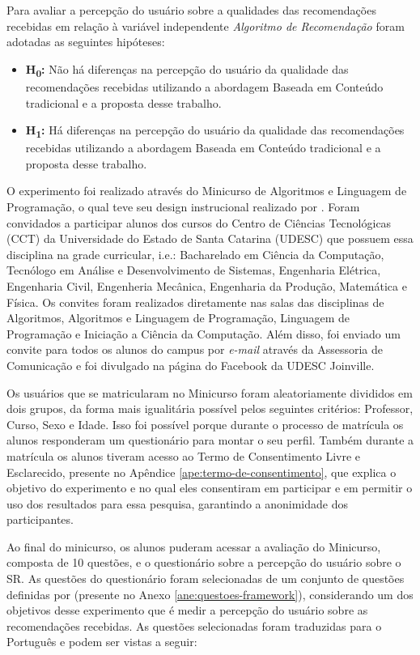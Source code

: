 Para avaliar a percepção do usuário sobre a qualidades das recomendações recebidas em relação
à variável independente \textit{Algoritmo de Recomendação} foram adotadas as seguintes hipóteses:

\begin{itemize}
\item \textbf{H\textsubscript{0}:} Não há diferenças na percepção do usuário da qualidade das recomendações recebidas utilizando a abordagem
Baseada em Conteúdo tradicional e a proposta desse trabalho.
\item \textbf{H\textsubscript{1}:} Há diferenças na percepção do usuário da qualidade das recomendações recebidas utilizando a abordagem
Baseada em Conteúdo tradicional e a proposta desse trabalho.
\end{itemize}

O experimento foi realizado através do Minicurso de Algoritmos e Linguagem de Programação, o qual teve seu design
instrucional realizado por . Foram convidados a participar alunos dos cursos do
Centro de Ciências Tecnológicas (CCT) da Universidade do Estado de Santa Catarina (UDESC) que possuem essa disciplina na
grade curricular, i.e.: Bacharelado em Ciência da Computação, Tecnólogo em Análise e Desenvolvimento de Sistemas, Engenharia
Elétrica, Engenharia Civil, Engenheria Mecânica, Engenharia da Produção, Matemática e Física. Os convites foram
realizados diretamente nas salas das disciplinas de Algoritmos, Algoritmos e Linguagem de Programação, Linguagem de
Programação e Iniciação a Ciência da Computação. Além disso, foi enviado um convite para todos os alunos do campus por
\textit{e-mail} através da Assessoria de Comunicação e foi divulgado na página do Facebook da UDESC Joinville.

Os usuários que se matricularam no Minicurso foram aleatoriamente divididos em dois grupos, da forma mais igualitária possível
pelos seguintes critérios: Professor, Curso, Sexo e Idade. Isso foi possível
porque durante o processo de matrícula os alunos responderam um questionário para montar o seu perfil. Também durante a
matrícula os alunos tiveram acesso ao Termo de Consentimento Livre e Esclarecido, presente no Apêndice
\ref{ape:termo-de-consentimento}, que explica o objetivo do experimento e no qual eles consentiram em participar e em
permitir o uso dos resultados para essa pesquisa, garantindo a anonimidade dos participantes.

Ao final do minicurso, os alunos puderam acessar a avaliação do Minicurso, composta de 10 questões, e o questionário
sobre a percepção do usuário sobre o SR. As questões do questionário foram selecionadas de um
conjunto de questões definidas por  (presente no Anexo \ref{ane:questoes-framework}), considerando
um dos objetivos desse experimento que é medir a percepção do usuário sobre as recomendações recebidas.
As questões selecionadas foram traduzidas para o Português e podem ser vistas a seguir:


